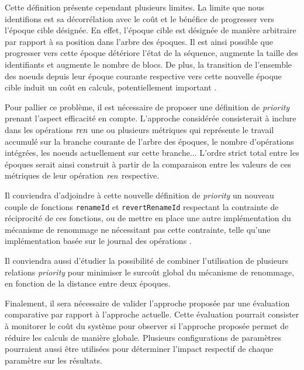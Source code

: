 Cette définition présente cependant plusieurs limites.
La limite que nous identifions est sa décorrélation avec le coût et le bénéfice de progresser vers l'époque cible désignée.
En effet, l'époque cible est désignée de manière arbitraire par rapport à sa position dans l'arbre des époques.
Il est ainsi possible que progresser vers cette époque détériore l'état de la séquence, \ie augmente la taille des identifiants et augmente le nombre de blocs.
De plus, la transition de l'ensemble des noeuds depuis leur époque courante respective vers cette nouvelle époque cible induit un coût en calculs, potentiellement important .

Pour pallier ce problème, il est nécessaire de proposer une définition de \emph{priority} prenant l'aspect efficacité en compte.
L'approche considérée consisterait à inclure dans les opérations $\mathit{ren}$ une ou plusieurs métriques qui représente le travail accumulé sur la branche courante de l'arbre des époques, \eg le nombre d'opérations intégrées, les noeuds actuellement sur cette branche...
L'ordre strict total entre les époques serait ainsi construit à partir de la comparaison entre les valeurs de ces métriques de leur opération $\mathit{ren}$ respective.

Il conviendra d'adjoindre à cette nouvelle définition de \emph{priority} un nouveau couple de fonctions \texttt{renameId} et \texttt{revertRenameId} respectant la contrainte de réciprocité de ces fonctions, ou de mettre en place une autre implémentation du mécanisme de renommage ne nécessitant pas cette contrainte, telle qu'une implémentation basée sur le journal des opérations .

Il conviendra aussi d'étudier la possibilité de combiner l'utilisation de plusieurs relations \emph{priority} pour minimiser le surcoût global du mécanisme de renommage, \eg en fonction de la distance entre deux époques.

Finalement, il sera nécessaire de valider l'approche proposée par une évaluation comparative par rapport à l'approche actuelle.
Cette évaluation pourrait consister à monitorer le coût du système pour observer si l'approche proposée permet de réduire les calculs de manière globale.
Plusieurs configurations de paramètres pourraient aussi être utilisées pour déterminer l'impact respectif de chaque paramètre sur les résultats.
